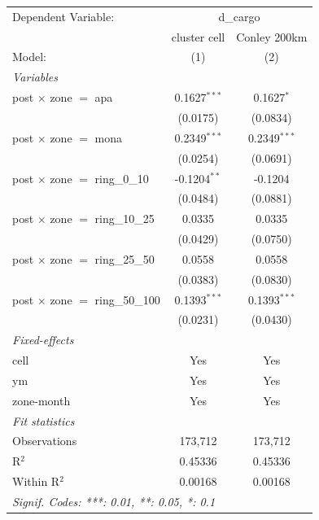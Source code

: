 
\begingroup
\centering
\begin{tabular}{lcc}
   \tabularnewline \midrule \midrule
   Dependent Variable: & \multicolumn{2}{c}{d\_cargo}\\
                                           & cluster cell   & Conley 200km \\   
   Model:                                  & (1)            & (2)\\  
   \midrule
   \emph{Variables}\\
   post $\times$ zone $=$ apa              & 0.1627$^{***}$ & 0.1627$^{*}$\\   
                                           & (0.0175)       & (0.0834)\\   
   post $\times$ zone $=$ mona             & 0.2349$^{***}$ & 0.2349$^{***}$\\   
                                           & (0.0254)       & (0.0691)\\   
   post $\times$ zone $=$ ring\_0\_10      & -0.1204$^{**}$ & -0.1204\\   
                                           & (0.0484)       & (0.0881)\\   
   post $\times$ zone $=$ ring\_10\_25     & 0.0335         & 0.0335\\   
                                           & (0.0429)       & (0.0750)\\   
   post $\times$ zone $=$ ring\_25\_50     & 0.0558         & 0.0558\\   
                                           & (0.0383)       & (0.0830)\\   
   post $\times$ zone $=$ ring\_50\_100    & 0.1393$^{***}$ & 0.1393$^{***}$\\   
                                           & (0.0231)       & (0.0430)\\   
   \midrule
   \emph{Fixed-effects}\\
   cell                                    & Yes            & Yes\\  
   ym                                      & Yes            & Yes\\  
   zone-month                              & Yes            & Yes\\  
   \midrule
   \emph{Fit statistics}\\
   Observations                            & 173,712        & 173,712\\  
   R$^2$                                   & 0.45336        & 0.45336\\  
   Within R$^2$                            & 0.00168        & 0.00168\\  
   \midrule \midrule
   \multicolumn{3}{l}{\emph{Signif. Codes: ***: 0.01, **: 0.05, *: 0.1}}\\
\end{tabular}
\par\endgroup


